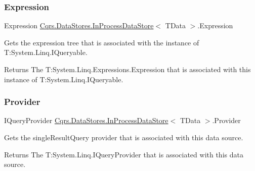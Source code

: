 \subsubsection{\texorpdfstring{Expression}{Expression}}
{\footnotesize\ttfamily Expression \hyperlink{classCqrs_1_1DataStores_1_1InProcessDataStore}{Cqrs.\+Data\+Stores.\+In\+Process\+Data\+Store}$<$ T\+Data $>$.Expression\hspace{0.3cm}{\ttfamily [get]}}



Gets the expression tree that is associated with the instance of T\+:\+System.\+Linq.\+I\+Queryable. 

\begin{DoxyReturn}{Returns}
The T\+:\+System.\+Linq.\+Expressions.\+Expression that is associated with this instance of T\+:\+System.\+Linq.\+I\+Queryable. 
\end{DoxyReturn}
\mbox{\label{classCqrs_1_1DataStores_1_1InProcessDataStore_a9f4e487d52f69245266afdf303d585c1}} 
\subsubsection{\texorpdfstring{Provider}{Provider}}
{\footnotesize\ttfamily I\+Query\+Provider \hyperlink{classCqrs_1_1DataStores_1_1InProcessDataStore}{Cqrs.\+Data\+Stores.\+In\+Process\+Data\+Store}$<$ T\+Data $>$.Provider\hspace{0.3cm}{\ttfamily [get]}}



Gets the single\+Result\+Query provider that is associated with this data source. 

\begin{DoxyReturn}{Returns}
The T\+:\+System.\+Linq.\+I\+Query\+Provider that is associated with this data source. 
\end{DoxyReturn}
